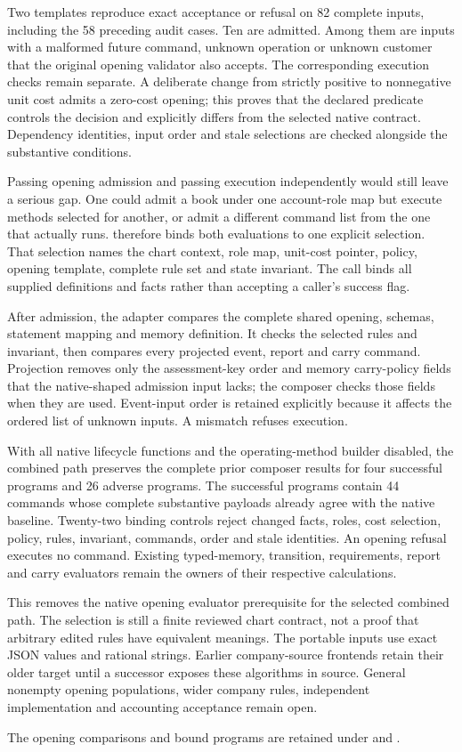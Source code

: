 Two templates reproduce exact acceptance or refusal on 82 complete inputs,
including the 58 preceding audit cases. Ten are admitted. Among them are
inputs with a malformed future command, unknown operation or unknown customer
that the original opening validator also accepts. The corresponding execution
checks remain separate. A deliberate change from strictly positive to
nonnegative unit cost admits a zero-cost opening; this proves that the declared
predicate controls the decision and explicitly differs from the selected native
contract. Dependency identities, input order and stale selections are checked
alongside the substantive conditions.

Passing opening admission and passing execution independently would still
leave a serious gap. One could admit a book under one account-role map but
execute methods selected for another, or admit a different command list from
the one that actually runs.  therefore binds
both evaluations to one explicit selection. That selection names the chart
context, role map, unit-cost pointer, policy, opening template, complete rule set
and state invariant. The call binds all supplied definitions and facts rather
than accepting a caller's success flag.

After admission, the adapter compares the complete shared opening, schemas,
statement mapping and memory definition. It checks the selected rules and
invariant, then compares every projected event, report and carry command.
Projection removes only the assessment-key order and memory carry-policy fields
that the native-shaped admission input lacks; the composer checks those fields
when they are used. Event-input order is retained explicitly because it affects
the ordered list of unknown inputs. A mismatch refuses execution.

With all native lifecycle functions and the operating-method builder disabled,
the combined path preserves the complete prior composer results for four
successful programs and 26 adverse programs. The successful programs contain
44 commands whose complete substantive payloads already agree with the native
baseline. Twenty-two binding controls reject changed facts, roles, cost
selection, policy, rules, invariant, commands, order and stale identities.
An opening refusal executes no command. Existing typed-memory, transition,
requirements, report and carry evaluators remain the owners of their respective
calculations.

This removes the native opening evaluator prerequisite for the selected
combined path. The selection is still a finite reviewed chart contract, not
a proof that arbitrary edited rules have equivalent meanings. The portable
inputs use exact JSON values and rational strings. Earlier company-source
frontends retain their older target until a successor exposes these algorithms
in source. General nonempty opening populations, wider company rules,
independent implementation and accounting acceptance remain open.

\begingroup\raggedright
The opening comparisons and bound programs are retained under
and .
\par
\endgroup
